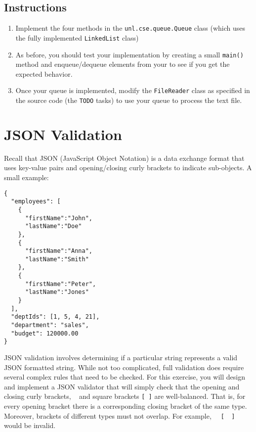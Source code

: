 \documentclass[12pt]{scrartcl}
\begin{document}
\subsection*{Instructions}

\begin{enumerate}
  \item Implement the four methods in the 
    \texttt{unl.cse.queue.Queue} class (which uses the fully 
    implemented \texttt{LinkedList} class)
  \item As before, you should test your implementation by creating a 
    small \texttt{main()} method and enqueue/dequeue elements 
    from your to see if you get the expected behavior.
  \item Once your queue is implemented, modify the 
    \texttt{FileReader} class as specified in the source 
    code (the \texttt{TODO} tasks) to use your queue to 
    process the text file.
\end{enumerate}    
    
\section*{JSON Validation}

Recall that JSON (JavaScript Object Notation) is a data exchange 
format that uses key-value pairs and opening/closing curly brackets 
to indicate sub-objects.  A small example:

\begin{verbatim}
{
  "employees": [
    { 
      "firstName":"John", 
      "lastName":"Doe" 
    }, 
    { 
      "firstName":"Anna", 
      "lastName":"Smith"
    }, 
    { 
      "firstName":"Peter", 
      "lastName":"Jones" 
    }
  ],
  "deptIds": [1, 5, 4, 21],
  "department": "sales",
  "budget": 120000.00
}
\end{verbatim}

JSON validation involves determining if a particular string represents 
a valid JSON formatted string.  While not too complicated, full 
validation does require several complex rules that need to be checked.  
For this exercise, you will design and implement a JSON validator that 
will simply check that the opening and closing curly brackets, 
\texttt{{ }} and square brackets
\texttt{[ ]} are well-balanced.  That is, 
for every opening bracket there is a corresponding closing bracket 
of the same type.  Moreover, brackets of different types must not 
overlap.  For example, \texttt{ { [ } ] } would be invalid. 
\end{document}
